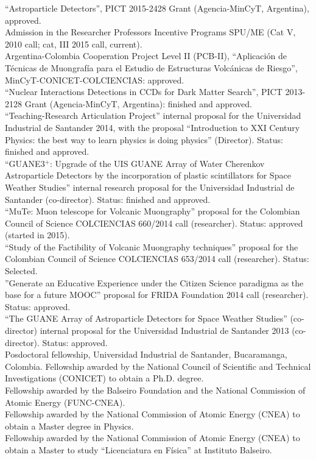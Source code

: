  ``Astroparticle Detectors'', PICT 2015-2428 Grant (Agencia-MinCyT, Argentina), approved.\\
 Admission in the Researcher Professors Incentive Programs SPU/ME (Cat V, 2010 call; cat, III 2015 call, current).\\
\ifres
\else
{} Argentina-Colombia Cooperation Project Level II (PCB-II), ``Aplicación de Técnicas de Muongrafía para el Estudio de Estructuras Volcánicas de Riesgo'', MinCyT-CONICET-COLCIENCIAS: approved.\\
 ``Nuclear Interactions Detections in CCDs for Dark Matter Search'', PICT 2013-2128 Grant (Agencia-MinCyT, Argentina): finished and approved.\\
 ``Teaching-Research Articulation Project'' internal proposal for the Universidad Industrial de Santander 2014, with the proposal ``Introduction to XXI Century Physics: the best way to learn physics is doing physics'' (Director). Status: finished and approved.\\
 ``GUANE3$^+$: Upgrade of the UIS GUANE Array of Water Cherenkov Astroparticle Detectors by the incorporation of plastic scintillators for Space Weather Studies'' internal research proposal for the Universidad Industrial de Santander (co-director). Status: finished and approved.\\
 ``MuTe: Muon telescope for Volcanic Muongraphy'' proposal for the Colombian Council of Science COLCIENCIAS 660/2014 call (researcher). Status: approved (started in 2015).\\
 ``Study of the Factibility of Volcanic Muongraphy techniques'' proposal for the Colombian Council of Science COLCIENCIAS 653/2014 call (researcher). Status: Selected.\\
 ''Generate an Educative Experience under the Citizen Science paradigma as the base for a future MOOC'' proposal for FRIDA Foundation 2014 call (researcher). Status: approved.\\
 ``The GUANE Array of Astroparticle Detectors for Space Weather Studies'' (co-director) internal proposal for the Universidad Industrial de Santander 2013 (co-director). Status: approved.\\
 Posdoctoral fellowship, Universidad Industrial de Santander, Bucaramanga, Colombia.
Fellowship awarded by the National Council of Scientific and Technical Investigations (CONICET) to obtain a Ph.D. degree.\\
Fellowship awarded by the Balseiro Foundation and the National Commission of Atomic Energy (FUNC-CNEA).\\
Fellowship awarded by the National Commission of Atomic Energy (CNEA) to obtain a Master degree in Physics.\\
Fellowship awarded by the National Commission of Atomic Energy (CNEA) to obtain a Master to study ``Licenciatura en Física'' at Instituto Balseiro.\\
\fi
\else
